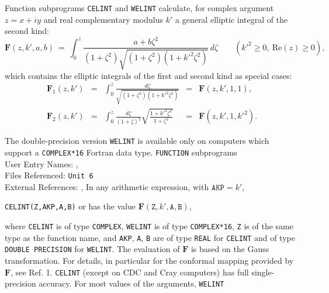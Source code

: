                        
                  
\Submitter{ }                           
                      \Revised{}
Function subprograms {\tt CELINT} and {\tt WELINT} calculate, for complex
argument $z=x+iy$ and real complementary modulus $k'$ a general
elliptic integral of the second kind:
$$ \mathbf{F}(z,k',a,b) \ = \ \displaystyle
\int_0^z \frac{a+b\zeta^2}{(1+\zeta^2)
\sqrt{(1+\zeta^2)(1+{k'}^2\zeta^2)}} \, d\zeta
\qquad ({k'}^2 \geq 0, \ \mathrm{Re}(z) \geq 0), $$
which contains the elliptic integrals of the first and second kind as
special cases:
$$ \begin{array}{rclcl}
\mathbf{F}_1(z,k') & = & \displaystyle \int_0^z \frac{d\zeta}
{\sqrt{(1+\zeta^2)(1+{k'}^2 \zeta^2)}} & = & \mathbf{F}(z,k',1,1),\\[6mm]
\mathbf{F}_2(z,k') & = & \displaystyle \int_0^z \frac{d\zeta}
{(1+\zeta)^2} \sqrt{\frac{1+{k'}^2 \zeta^2}{1+\zeta^2}} & = &
\mathbf{F}(z,k',1,{k'}^2).
\end{array} $$
\par
The double-precision version {\tt WELINT} is available only on computers
which support a {\tt COMPLEX*16} Fortran data type.
\Structure
{\tt FUNCTION} subprograms \\
User Entry Names: ,  \\
Files Referenced: {\tt Unit 6} \\
External References: , 
\Usage
In any arithmetic expression, with $\mathtt{AKP}=k'$,
\begin{center}
{\tt CELINT(Z,AKP,A,B)} \quad or  \quad
has the value \quad $\mathbf{F}(\mathtt{Z},k',\mathtt{A,B})$,
\end{center}
where {\tt CELINT} is of type {\tt COMPLEX}, {\tt WELINT} is of type
{\tt COMPLEX*16}, {\tt Z} is of the same type as the function name,
and {\tt AKP}, {\tt A}, {\tt B} are of type {\tt REAL} for {\tt CELINT}
and of type {\tt DOUBLE PRECISION} for {\tt WELINT}.
\Method
The evaluation of $\mathbf{F}$ is based on the Gauss transformation.
For details, in particular for the conformal mapping provided by
$\mathbf{F}$, see Ref. 1.
\Accuracy
{\tt CELINT} (except on CDC and Cray computers)
has full single-precision accuracy.
For most values of the arguments, {\tt WELINT}
